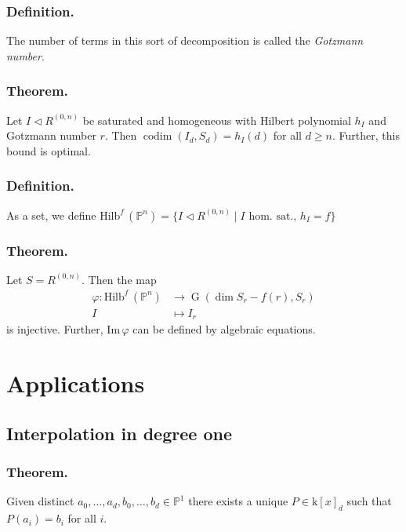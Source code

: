 \documentclass[10pt]{article}
\numberwithin{equation}{subsubsection}
\DeclareMathOperator{\G}{G}
\DeclareMathOperator{\codim}{codim}
\renewcommand{\P}{\mathbb{P}}
\renewcommand{\k}{\mathrm{k}}
\renewcommand{\Im}{\mathrm{Im}\,}
\newcommand{\Hilb}[1]{\mathrm{Hilb}^{#1}\,}
\begin{document}
            \subsubsection{Definition.} The number of terms in this sort of decomposition is called the \textit{Gotzmann number}.
            
            \subsubsection{Theorem.} Let $I\triangleleft R^{(0,n)}$ be saturated and homogeneous with Hilbert polynomial $h_I$ and Gotzmann number $r$. Then $\codim(I_d,S_d)=h_I(d)$ for all $d\geqslant n$. Further, this bound is optimal.
            
            \subsubsection{Definition.} As a set, we define $\Hilb{f}(\P^n)=\{I\triangleleft R^{(0,n)}\mid I\text{ hom. sat., }h_I=f\}$
            
            \subsubsection{Theorem.} Let $S=R^{(0,n)}$. Then the map
                \begin{align*}
                    \varphi \colon \Hilb{f}(\P^n) &\to \G(\dim S_r-f(r),S_r)\\
                    I &\mapsto I_r
                \end{align*}
                is injective. Further, $\Im\varphi$ can be defined by algebraic equations.
                
    \section{Applications}
    
        \subsection{Interpolation in degree one}
        
            \subsubsection{Theorem.}\label{first-interpolation-theorem} Given distinct $a_0,\ldots,a_d,b_0,\ldots,b_d\in\P^1$ there exists a unique $P\in\k[x]_d$ such that \mbox{$P(a_i)=b_i$} for all $i$.
            
\end{document}
